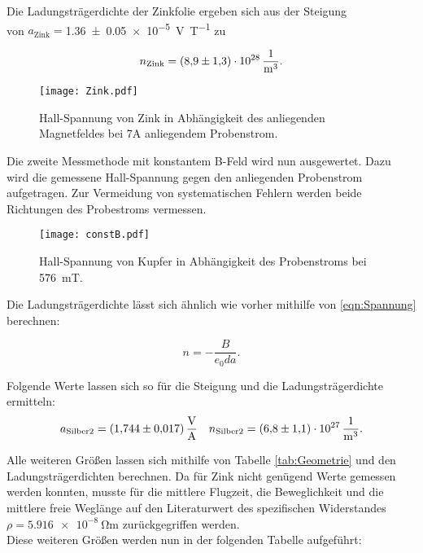 \noindent Die Ladungsträgerdichte der Zinkfolie ergeben sich aus der Steigung \\
von $a_\text{Zink}=$\qty{1.36\pm0.05e-5}{\volt\per\tesla} zu 

\begin{equation*}
    n_\text{Zink} = \qty{8.9\pm1.3e28}{\per\cubic\meter}.
\end{equation*}

\begin{figure}[H]
    \centering
    \label{Zink}
    \texttt{[image: Zink.pdf]}
    \caption{Hall-Spannung von Zink in Abhängigkeit des anliegenden Magnetfeldes bei 7A anliegendem Probenstrom.}
\end{figure}

\noindent Die zweite Messmethode mit konstantem B-Feld wird nun ausgewertet. Dazu wird die gemessene Hall-Spannung 
gegen den anliegenden Probenstrom aufgetragen. Zur Vermeidung von systematischen Fehlern werden beide Richtungen des 
Probestroms vermessen.

\begin{figure}[H]
    \centering
    \texttt{[image: constB.pdf]}
    \caption{Hall-Spannung von Kupfer in Abhängigkeit des Probenstroms bei \qty{576}{\milli\tesla}.}
\end{figure}

\noindent Die Ladungsträgerdichte lässt sich ähnlich wie vorher mithilfe von \eqref{eqn:Spannung} berechnen:

\begin{equation*}
    n = - \frac{B}{e_0 d a}.
\end{equation*}

\noindent Folgende Werte lassen sich so für die Steigung und die Ladungsträgerdichte ermitteln:
\begin{align*}
    a_\text{Silber2}=\qty{1.744 \pm 0.017}{\volt\per\ampere} && n_\text{Silber2} = \qty{6.8\pm 1.1e27}{\per\cubic\meter}.
\end{align*}

\noindent Alle weiteren Größen lassen sich mithilfe von Tabelle \ref{tab:Geometrie} und den Ladungsträgerdichten 
berechnen. Da für Zink nicht genügend Werte gemessen werden konnten, musste für die mittlere Flugzeit, die Beweglichkeit und 
die mittlere freie Weglänge auf den Literaturwert des spezifischen Widerstandes $\rho = \qty{5.916e-8}{\ohm \meter}$ 
\cite{spezifischer_Widerstand} zurückgegriffen werden.\\
\noindent Diese weiteren Größen werden nun in der folgenden Tabelle aufgeführt:

